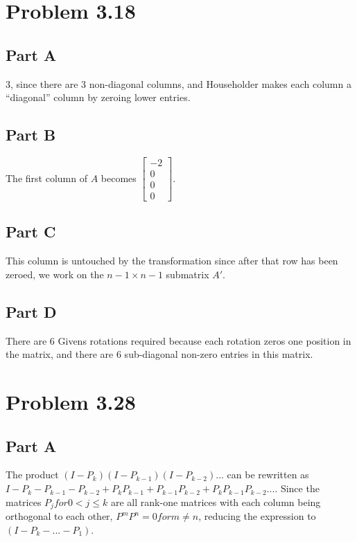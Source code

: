 \documentclass[paper=a4, fontsize=11pt]{scrartcl} %
\numberwithin{equation}{section} %
\numberwithin{figure}{section} %
\numberwithin{table}{section} %
\begin{document}

\section*{Problem 3.18}
\subsection*{Part A}
3, since there are 3 non-diagonal columns, and Householder makes each column a ``diagonal'' column by zeroing lower entries.

\subsection*{Part B}
The first column of $A$ becomes $\left[\begin{array}{c}
			   -2\\
			   0\\
			   0\\
			   0
			\end{array}\right]$.

\subsection*{Part C}
This column is untouched by the transformation since after that row has been zeroed, we work on the $n - 1 \times n - 1$ submatrix $A'$.

\subsection*{Part D}
There are 6 Givens rotations required because each rotation zeros one position in the matrix, and there are 6 sub-diagonal non-zero entries in this matrix.




\section*{Problem 3.28}

\subsection*{Part A}
The product $(I - P_k)(I - P_{k - 1})(I - P_{k - 2}) ...$ can be rewritten as $I - P_{k} - P_{k - 1} - P_{k - 2} + P_{k}P_{k - 1} + P_{k-1}P_{k-2} + P_{k}P_{k-1}P_{k-2} ...$. Since the matrices $P_j for  0 < j \leq k$ are all rank-one matrices with each column being orthogonal to each other, $P^mP^n = 0 for m \neq n$, reducing the expression to $(I - P_k - ... - P_1)$.
\end{document}
